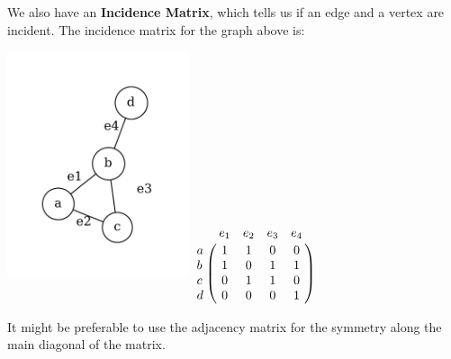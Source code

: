 We also have an \textbf{Incidence Matrix}, which tells us if an edge and a vertex are incident. The incidence matrix for the graph above is:
\begin{center}
    \includegraphics[width=0.4\textwidth]{Chapter1/mat.pdf} $\bordermatrix{~ & e_1 & e_2 & e_3 & e_4 \cr
                                                                           a & 1 & 1 & 0 & 0 \cr
                                                                           b & 1 & 0 & 1 & 1 \cr
                                                                           c & 0 & 1 & 1 & 0 \cr
                                                                           d & 0 & 0 & 0 & 1 }$
\end{center}
It might be preferable to use the adjacency matrix for the symmetry along the main diagonal of the matrix. 